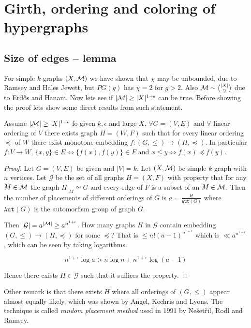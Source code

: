 \chapter{Girth, ordering and coloring of hypergraphs}

\section{Size of edges -- lemma}

For simple $k$-graphs $(X, \mathcal{M})$ we have shown that $\chi$ may be unbounded, due to Ramsey and Hales Jewett, but $PG(g)$ has $\chi = 2$ for $g > 2$. Also $\mathcal{M} \sim \binom{|X|}{2}$ due to Erd\H os and Hanani. Now lets see if $|\mathcal{M}| \geq |X|^{1 + \epsilon}$ can be true. Before showing the proof lets show some direct results from such statement.

\begin{thm}
	Assume $|\mathcal{M}| \geq |X|^{1 + \epsilon}$ fo given $k, \epsilon$ and large $X$. $\forall G = (V,E)$ and $\forall$ linear ordering of $V$ there exists graph $H = (W,F)$ such that for every linear ordering $\preceq$ of $W$ there exist monotone embedding $f : (G, \leq) \to (H, \preceq)$. In particular $f : V \to W$, $\{x,y\} \in E \iff \{f(x), f(y)\} \in F$ and $x \leq y \iff f(x) \preceq f(y)$.
\end{thm}

\begin{proof}
	Let $G = (V,E)$ be given and $|V| = k$. Let $(X, \mathcal{M})$ be simple $k$-graph with $n$ vertices. Let $\mathcal{G}$ be the set of all graphs $H = (X,F)$ with property that for any $M \in \mathcal{M}$ the graph $H|_M \simeq G$ and every edge of $F$ is a subset of an $M \in \mathcal{M}$. Then the number of placements of different orderings of $G$ is $a = \frac{k!}{\mathtt{Aut}(G)}$ where $\mathtt{Aut}(G)$ is the automorfism group of graph $G$.
	
	Then $|\mathcal{G}| = a^{|\mathcal{M}|} \geq a^{n^{1+\epsilon}}$. How many graphs $H$ in $\mathcal{G}$ contain embedding $(G, \leq) \to (H, \preceq)$ for some $\preceq$? That is $\leq n! (a - 1)^{n^{1+\epsilon}}$ which is $\ll a^{n^{1+\epsilon}}$, which can be seen by taking logarithms.
	
	$$
	n^{1 + \epsilon} \log a > n \log n + n^{1 + \epsilon} \log(a-1)
	$$
	
	\noindent Hence there exists $H \in \mathcal{G}$ such that it suffices the property.
\end{proof}

Other remark is that there exists $H$ where all orderings of $(G, \leq)$ appear almost equally likely, which was shown by Angel, Kechris and Lyons. The technique is called \textit{random placement method} used in 1991 by Nešetřil, Rodl and Ramsey.

